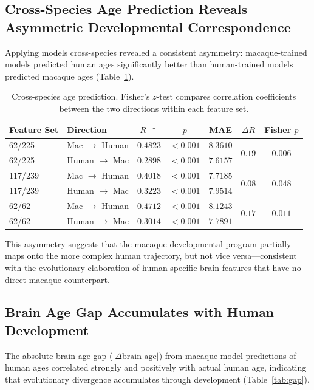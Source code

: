 \documentclass[11pt]{article}
\begin{document}
\subsection{Cross-Species Age Prediction Reveals Asymmetric Developmental Correspondence}

Applying models cross-species revealed a consistent asymmetry: macaque-trained models predicted human ages significantly better than human-trained models predicted macaque ages (Table~\ref{tab:cross}).

\begin{table}[H]
\centering
\caption{Cross-species age prediction. Fisher's $z$-test compares correlation coefficients between the two directions within each feature set.}
\label{tab:cross}
\begin{tabular}{llccccc}
\toprule
Feature Set & Direction & $R$ $\uparrow$ & $p$ & MAE & $\Delta R$ & Fisher $p$ \\
\midrule
62/225 & Mac $\to$ Human & $\mathbf{0.4823}$ & $< 0.001$ & $8.3610$ & \multirow{2}{*}{$0.19$} & \multirow{2}{*}{$0.006$} \\
62/225 & Human $\to$ Mac & $0.2898$ & $< 0.001$ & $7.6157$ & & \\
\midrule
117/239 & Mac $\to$ Human & $\mathbf{0.4018}$ & $< 0.001$ & $7.7185$ & \multirow{2}{*}{$0.08$} & \multirow{2}{*}{$0.048$} \\
117/239 & Human $\to$ Mac & $0.3223$ & $< 0.001$ & $7.9514$ & & \\
\midrule
62/62 & Mac $\to$ Human & $\mathbf{0.4712}$ & $< 0.001$ & $8.1243$ & \multirow{2}{*}{$0.17$} & \multirow{2}{*}{$0.011$} \\
62/62 & Human $\to$ Mac & $0.3014$ & $< 0.001$ & $7.7891$ & & \\
\bottomrule
\end{tabular}
\end{table}

This asymmetry suggests that the macaque developmental program partially maps onto the more complex human trajectory, but not vice versa---consistent with the evolutionary elaboration of human-specific brain features that have no direct macaque counterpart.

\subsection{Brain Age Gap Accumulates with Human Development}

The absolute brain age gap ($|\Delta \text{brain age}|$) from macaque-model predictions of human ages correlated strongly and positively with actual human age, indicating that evolutionary divergence accumulates through development (Table~\ref{tab:gap}).
\end{document}
